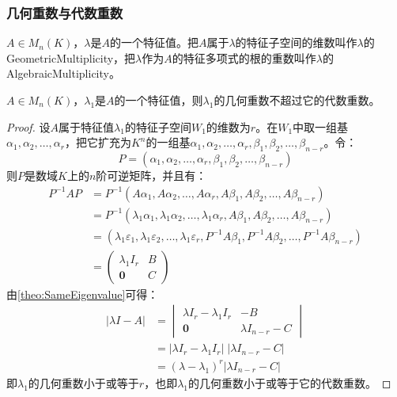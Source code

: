 \subsubsection{几何重数与代数重数}
\begin{definition}
	$A\in M_{n}(K)$，$\lambda$是$A$的一个特征值。把$A$属于$\lambda$的特征子空间的维数叫作$\lambda$的\gls{GeometricMultiplicity}，把$\lambda$作为$A$的特征多项式的根的重数叫作$\lambda$的\gls{AlgebraicMultiplicity}。
\end{definition}
\begin{theorem}\label{theo:AlgebraicMultiplicityGeometricMultiplicity}
	$A\in M_{n}(K)$，$\lambda_1$是$A$的一个特征值，则$\lambda_1$的几何重数不超过它的代数重数。
\end{theorem}
\begin{proof}
	设$A$属于特征值$\lambda_1$的特征子空间$W_1$的维数为$r$。在$W_1$中取一组基$\alpha_1,\alpha_2,\dots,\alpha_r$，把它扩充为$K^n$的一组基$\alpha_1,\alpha_2,\dots,\alpha_r,\beta_1,\beta_2,\dots,\beta_{n-r}$。令：
	\begin{equation*}
		P=(\alpha_1,\alpha_2,\dots,\alpha_r,\beta_1,\beta_2,\dots,\beta_{n-r})
	\end{equation*}
	则$P$是数域$K$上的$n$阶可逆矩阵，并且有：
	\begin{align*}
		P^{-1}AP
		&=P^{-1}(A\alpha_1,A\alpha_2,\dots,A\alpha_r,A\beta_1,A\beta_2,\dots,A\beta_{n-r}) \\
		&=P^{-1}(\lambda_1\alpha_1,\lambda_1\alpha_2,\dots,\lambda_1\alpha_r,A\beta_1,A\beta_2,\dots,A\beta_{n-r}) \\
		&=(\lambda_1\varepsilon_1,\lambda_1\varepsilon_2,\dots,\lambda_1\varepsilon_r,P^{-1}A\beta_1,P^{-1}A\beta_2,\dots,P^{-1}A\beta_{n-r}) \\
		&=
		\begin{pmatrix}
			\lambda_1I_r & B \\
			\mathbf{0} & C
		\end{pmatrix}
	\end{align*}
	由\cref{theo:SameEigenvalue}可得：
	\begin{align*}
		|\lambda I-A|&=
		\begin{vmatrix}
			\lambda I_r-\lambda_1I_r & -B \\
			\mathbf{0} & \lambda I_{n-r}-C
		\end{vmatrix} \\
		&=|\lambda I_r-\lambda_1I_r|\;|\lambda I_{n-r}-C| \\
		&=(\lambda-\lambda_1)^r|\lambda I_{n-r}-C|
	\end{align*}
	即$\lambda_1$的几何重数小于或等于$r$，也即$\lambda_1$的几何重数小于或等于它的代数重数。
\end{proof}

